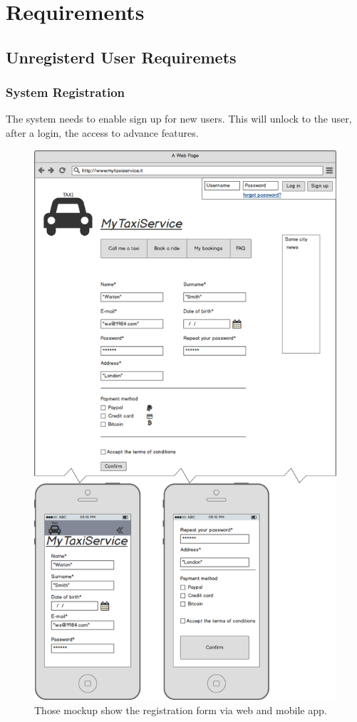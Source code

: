 \section{Requirements}
	\subsection {Unregisterd User Requiremets}
		\subsubsection {System Registration}
			The system needs to enable sign up for new users. This will unlock to the user, after a login, the access to advance features.
			\begin{figure}[!h]
				\includegraphics[height=0.7\textheight]{mockup/signup.png}
				\caption{Those mockup show the registration form via web and mobile app.}
			\end{figure}
			\newpage

